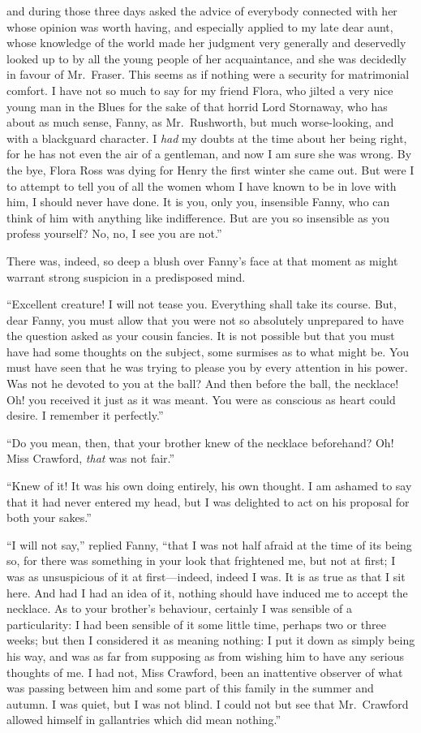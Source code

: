 and during those three days asked the advice of everybody
connected with her whose opinion was worth having,
and especially applied to my late dear aunt, whose
knowledge of the world made her judgment very generally
and deservedly looked up to by all the young people
of her acquaintance, and she was decidedly in favour
of Mr.\ Fraser.  This seems as if nothing were a security
for matrimonial comfort.  I have not so much to say
for my friend Flora, who jilted a very nice young man
in the Blues for the sake of that horrid Lord Stornaway,
who has about as much sense, Fanny, as Mr.\ Rushworth,
but much worse-looking, and with a blackguard character.
I \emph{had} my doubts at the time about her being right,
for he has not even the air of a gentleman, and now I am
sure she was wrong.  By the bye, Flora Ross was dying
for Henry the first winter she came out.  But were I
to attempt to tell you of all the women whom I have
known to be in love with him, I should never have done.
It is you, only you, insensible Fanny, who can think
of him with anything like indifference.  But are you
so insensible as you profess yourself?  No, no, I see you
are not.''

There was, indeed, so deep a blush over Fanny's face
at that moment as might warrant strong suspicion
in a predisposed mind.

``Excellent creature!  I will not tease you.  Everything shall
take its course.  But, dear Fanny, you must allow that you
were not so absolutely unprepared to have the question asked
as your cousin fancies.  It is not possible but that you
must have had some thoughts on the subject, some surmises
as to what might be.  You must have seen that he was
trying to please you by every attention in his power.
Was not he devoted to you at the ball?  And then before
the ball, the necklace!  Oh! you received it just as it
was meant.  You were as conscious as heart could desire.
I remember it perfectly.''

``Do you mean, then, that your brother knew of the
necklace beforehand?  Oh!  Miss Crawford, \emph{that} was not fair.''

``Knew of it!  It was his own doing entirely, his own thought.
I am ashamed to say that it had never entered my head,
but I was delighted to act on his proposal for both
your sakes.''

``I will not say,'' replied Fanny, ``that I was not half
afraid at the time of its being so, for there was something
in your look that frightened me, but not at first;
I was as unsuspicious of it at first---indeed, indeed I was.
It is as true as that I sit here.  And had I had an idea of it,
nothing should have induced me to accept the necklace.
As to your brother's behaviour, certainly I was sensible of
a particularity:  I had been sensible of it some little time,
perhaps two or three weeks; but then I considered it as
meaning nothing:  I put it down as simply being his way,
and was as far from supposing as from wishing him to have
any serious thoughts of me.  I had not, Miss Crawford,
been an inattentive observer of what was passing between him
and some part of this family in the summer and autumn.
I was quiet, but I was not blind.  I could not but see
that Mr.\ Crawford allowed himself in gallantries which did
mean nothing.''

